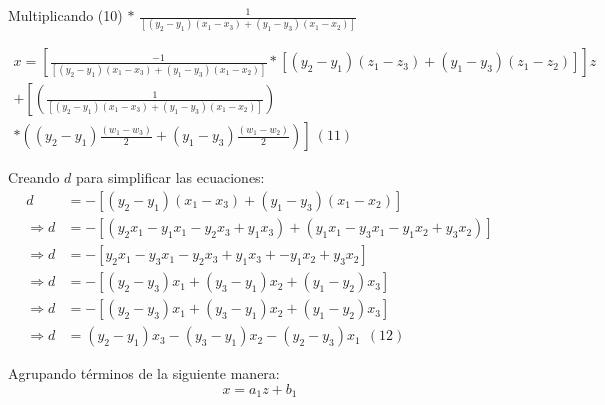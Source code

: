             Multiplicando (10) $\ast$   $\frac{1}{ \left[  \left( y_{2}-y_{1} \right)  \left( x_{1}-x_{3} \right) +  \left( y_{1}-y_{3} \right)  \left( x_{1}-x_{2} \right)  \right] }$
            
        \begin{multline*}
             x= \left[ \frac{-1}{ \left[  \left( y_{2}-y_{1} \right)  \left( x_{1}-x_{3} \right) +  \left( y_{1}-y_{3} \right)  \left( x_{1}-x_{2} \right)  \right] }\ast \left[  \left( y_{2}-y_{1} \right)  \left( z_{1}-z_{3} \right) + \left( y_{1}-y_{3} \right)  \left( z_{1}-z_{2} \right)  \right]  \right] z\\+ \left[  \left( \frac{1}{ \left[  \left( y_{2}-y_{1} \right)  \left( x_{1}-x_{3} \right) +  \left( y_{1}-y_{3} \right)  \left( x_{1}-x_{2} \right)  \right] } \right)\right. \\  \left.\ast \left( \left(y_{2}-y_{1} \right) \frac{ \left( w_{1} - w_{3} \right) }{2}+ \left( y_{1}-y_{3} \right) \frac{ \left( w_{1} - w_{2} \right) }{2}\right)\right] ~ \left( 11 \right) 
        \end{multline*}
        
        Creando $d$ para simplificar las ecuaciones:
        \begin{align*}
              d&= - \left[  \left( y_{2}-y_{1} \right)  \left( x_{1}-x_{3} \right) +  \left( y_{1}-y_{3} \right)  \left( x_{1}-x_{2} \right)  \right] \\
             \Longrightarrow d&= - \left[  \left( y_{2}x_{1}-y_{1}x_{1}- y_{2}x_{3}+y_{1}x_{3} \right) +  \left( y_{1}x_{1}-y_{3}x_{1}-y_{1}x_{2}+y_{3}x_{2} \right)  \right]\\
             \Longrightarrow d&= - \left[ y_{2}x_{1}-y_{3}x_{1}- y_{2}x_{3}+y_{1}x_{3}+ -y_{1}x_{2}+y_{3}x_{2} \right] \\
             \Longrightarrow d&=- \left[  \left( y_{2}-y_{3} \right) x_{1}+ \left( y_{3}-y_{1} \right) x_{2}+ \left( y_{1}- y_{2} \right) x_{3} \right] \\
             \Longrightarrow d&=- \left[  \left( y_{2}-y_{3} \right) x_{1}+ \left( y_{3}-y_{1} \right) x_{2}+ \left( y_{1}- y_{2} \right) x_{3} \right] \\
             \Longrightarrow d&= \left( y_{2}- y_{1} \right) x_{3}- \left( y_{3}-y_{1} \right) x_{2}-  \left( y_{2}-y_{3} \right) x_{1}~~  \left( 12 \right)             
        \end{align*}
        
        \newpage

        Agrupando términos de la siguiente manera:
        \begin{equation*}
            x= a_{1}z+ b_{1}
        \end{equation*}

